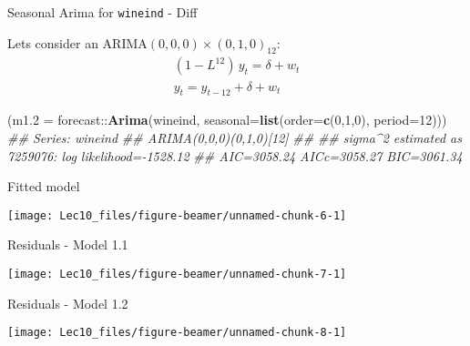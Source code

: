 \documentclass[11pt,ignorenonframetext,]{beamer}
\newenvironment{Shaded}{}{}
\newcommand{\CommentTok}[1]{\textcolor[rgb]{0.38,0.63,0.69}{\textit{#1}}}
\newcommand{\DataTypeTok}[1]{\textcolor[rgb]{0.56,0.13,0.00}{#1}}
\newcommand{\DecValTok}[1]{\textcolor[rgb]{0.25,0.63,0.44}{#1}}
\newcommand{\KeywordTok}[1]{\textcolor[rgb]{0.00,0.44,0.13}{\textbf{#1}}}
\newcommand{\NormalTok}[1]{#1}
\newcommand{\OperatorTok}[1]{\textcolor[rgb]{0.40,0.40,0.40}{#1}}
\let\oldShaded\Shaded
\let\endoldShaded\endShaded
\renewenvironment{Shaded}{\footnotesize\begin{spacing}{0.9}\oldShaded}{\endoldShaded\end{spacing}}
\begin{document}
\begin{frame}[fragile,t]{Seasonal Arima for \texttt{wineind} - Diff}
\protect\hypertarget{seasonal-arima-for---diff}{}

Lets consider an \(\text{ARIMA}(0,0,0) \times (0,1,0)_{12}\): \[
\begin{aligned}
(1 - L^{12}) \, y_t = \delta + w_t \\
y_t = y_{t-12} + \delta + w_t
\end{aligned}
\] \vspace{2mm}

\begin{Shaded}
\begin{Highlighting}[]
\NormalTok{(}\DataTypeTok{m1.2 =}\NormalTok{ forecast}\OperatorTok{::}\KeywordTok{Arima}\NormalTok{(wineind, }\DataTypeTok{seasonal=}\KeywordTok{list}\NormalTok{(}\DataTypeTok{order=}\KeywordTok{c}\NormalTok{(}\DecValTok{0}\NormalTok{,}\DecValTok{1}\NormalTok{,}\DecValTok{0}\NormalTok{), }\DataTypeTok{period=}\DecValTok{12}\NormalTok{)))}
\CommentTok{## Series: wineind }
\CommentTok{## ARIMA(0,0,0)(0,1,0)[12] }
\CommentTok{## }
\CommentTok{## sigma^2 estimated as 7259076:  log likelihood=-1528.12}
\CommentTok{## AIC=3058.24   AICc=3058.27   BIC=3061.34}
\end{Highlighting}
\end{Shaded}

\end{frame}

\begin{frame}{Fitted model}
\protect\hypertarget{fitted-model-1}{}

\begin{center}\texttt{[image: Lec10\_files/figure-beamer/unnamed-chunk-6-1]} \end{center}

\end{frame}

\begin{frame}{Residuals - Model 1.1}
\protect\hypertarget{residuals---model-1.1}{}

\begin{center}\texttt{[image: Lec10\_files/figure-beamer/unnamed-chunk-7-1]} \end{center}

\end{frame}

\begin{frame}{Residuals - Model 1.2}
\protect\hypertarget{residuals---model-1.2}{}

\begin{center}\texttt{[image: Lec10\_files/figure-beamer/unnamed-chunk-8-1]} \end{center}

\end{frame}
\end{document}
